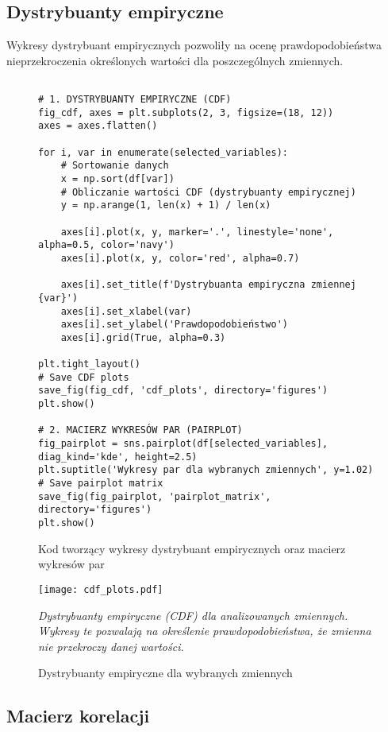 \documentclass[12pt,a4paper]{article}
\newcommand{\kod}[2]{
    \begin{figure}[H]
        \begin{lstlisting}[style=pythonstyle]
#1
        \end{lstlisting}
        \caption{#2}
    \end{figure}
}
\begin{document}
\subsection{Dystrybuanty empiryczne}

Wykresy dystrybuant empirycznych pozwoliły na ocenę prawdopodobieństwa nieprzekroczenia określonych wartości dla poszczególnych zmiennych.

\kod{
# 1. DYSTRYBUANTY EMPIRYCZNE (CDF)
fig_cdf, axes = plt.subplots(2, 3, figsize=(18, 12))
axes = axes.flatten()

for i, var in enumerate(selected_variables):
    # Sortowanie danych
    x = np.sort(df[var])
    # Obliczanie wartości CDF (dystrybuanty empirycznej)
    y = np.arange(1, len(x) + 1) / len(x)
    
    axes[i].plot(x, y, marker='.', linestyle='none', alpha=0.5, color='navy')
    axes[i].plot(x, y, color='red', alpha=0.7)
    
    axes[i].set_title(f'Dystrybuanta empiryczna zmiennej {var}')
    axes[i].set_xlabel(var)
    axes[i].set_ylabel('Prawdopodobieństwo')
    axes[i].grid(True, alpha=0.3)

plt.tight_layout()
# Save CDF plots
save_fig(fig_cdf, 'cdf_plots', directory='figures')
plt.show()

# 2. MACIERZ WYKRESÓW PAR (PAIRPLOT)
fig_pairplot = sns.pairplot(df[selected_variables], diag_kind='kde', height=2.5)
plt.suptitle('Wykresy par dla wybranych zmiennych', y=1.02)
# Save pairplot matrix
save_fig(fig_pairplot, 'pairplot_matrix', directory='figures')
plt.show()
}{Kod tworzący wykresy dystrybuant empirycznych oraz macierz wykresów par}

\begin{figure}[H]
    \centering
    \texttt{[image: cdf\_plots.pdf]}
    \caption{Dystrybuanty empiryczne dla wybranych zmiennych}
    \label{fig:cdf_plots}
    \small\textit{Dystrybuanty empiryczne (CDF) dla analizowanych zmiennych. Wykresy te pozwalają na określenie prawdopodobieństwa, że zmienna nie przekroczy danej wartości.}
\end{figure}

\subsection{Macierz korelacji}
\end{document}
